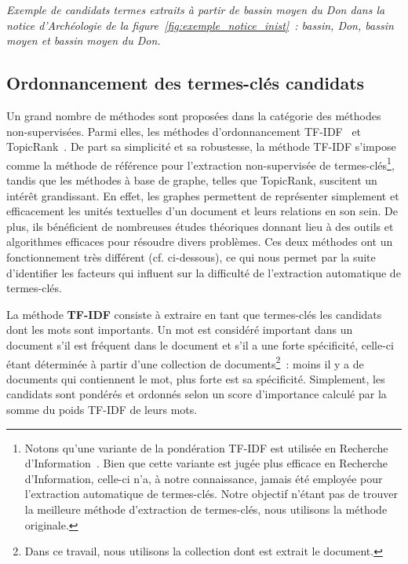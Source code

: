     \textit{Exemple de candidats termes extraits à partir de \og{}bassin moyen
    du Don\fg{} dans la notice d'Archéologie de la
    figure~\ref{fig:exemple_notice_inist}~: \og{}bassin\fg{}, \og{}Don\fg{},
    \og{}bassin moyen\fg{} et \og{}bassin moyen du Don\fg{}.}

  \subsection{Ordonnancement des termes-clés candidats}
  \label{subsec:extraction_de_termes_cles}
    Un grand nombre de méthodes sont proposées dans la catégorie des méthodes
    non-supervisées. Parmi elles, les méthodes d'ordonnancement
    TF-IDF~\cite{jones1972tfidf} et TopicRank~\cite{bougouin2013topicrank}. De
    part sa simplicité et sa robustesse, la méthode TF-IDF s'impose comme la
    méthode de référence pour l'extraction non-supervisée de
    termes-clés\footnote{Notons qu'une variante de la pondération TF-IDF est
    utilisée en Recherche
    d'Information~\cite[Okapi]{robertson1999okapi,claveau2012vectorisation}.
    Bien que cette variante est jugée plus efficace en Recherche d'Information,
    celle-ci n'a, à notre connaissance, jamais été employée pour l'extraction
    automatique de termes-clés. Notre objectif n'étant pas de trouver la
    meilleure méthode d'extraction de termes-clés, nous utilisons la méthode
    originale.}, tandis que les méthodes à base de graphe, telles que TopicRank,
    suscitent un intérêt grandissant. En effet, les graphes permettent de
    représenter simplement et efficacement les unités textuelles d'un document
    et leurs relations en son sein. De plus, ils bénéficient de nombreuses
    études théoriques donnant lieu à des outils et algorithmes efficaces pour
    résoudre divers problèmes. Ces deux méthodes ont un fonctionnement très
    différent (cf. ci-dessous), ce qui nous permet par la suite d'identifier les
    facteurs qui influent sur la difficulté de l'extraction automatique de
    termes-clés.

    La méthode \textbf{TF-IDF} consiste à extraire en tant que termes-clés les
    candidats dont les mots sont importants. Un mot est considéré
    important dans un document s'il est fréquent dans le document et s'il a une
    forte spécificité, celle-ci étant déterminée à partir d'une
    collection de documents\footnote{Dans ce travail, nous utilisons la
    collection dont est extrait le document.}~: moins il y a de documents qui
    contiennent le mot, plus forte est sa spécificité. Simplement, les candidats
    sont pondérés et ordonnés selon un score d'importance calculé par la somme
    du poids TF-IDF de leurs mots.

